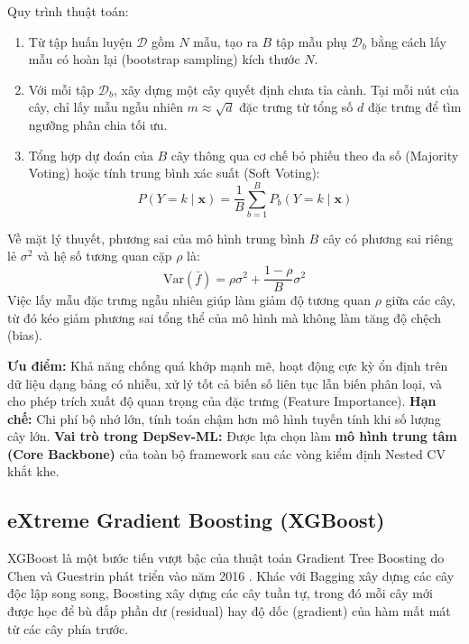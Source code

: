 Quy trình thuật toán:
\begin{enumerate}
    \item Từ tập huấn luyện $\mathcal{D}$ gồm $N$ mẫu, tạo ra $B$ tập mẫu phụ $\mathcal{D}_b$ bằng cách lấy mẫu có hoàn lại (bootstrap sampling) kích thước $N$.
    \item Với mỗi tập $\mathcal{D}_b$, xây dựng một cây quyết định chưa tỉa cành. Tại mỗi nút của cây, chỉ lấy mẫu ngẫu nhiên $m \approx \sqrt{d}$ đặc trưng từ tổng số $d$ đặc trưng để tìm ngưỡng phân chia tối ưu.
    \item Tổng hợp dự đoán của $B$ cây thông qua cơ chế bỏ phiếu theo đa số (Majority Voting) hoặc tính trung bình xác suất (Soft Voting):
    \begin{equation}
        P(Y = k \mid \mathbf{x}) = \frac{1}{B} \sum_{b=1}^B P_b(Y = k \mid \mathbf{x})
    \end{equation}
\end{enumerate}

Về mặt lý thuyết, phương sai của mô hình trung bình $B$ cây có phương sai riêng lẻ $\sigma^2$ và hệ số tương quan cặp $\rho$ là:
\begin{equation}
    \text{Var}(\bar{f}) = \rho \sigma^2 + \frac{1 - \rho}{B} \sigma^2
\end{equation}
Việc lấy mẫu đặc trưng ngẫu nhiên giúp làm giảm độ tương quan $\rho$ giữa các cây, từ đó kéo giảm phương sai tổng thể của mô hình mà không làm tăng độ chệch (bias).

\textbf{Ưu điểm:} Khả năng chống quá khớp mạnh mẽ, hoạt động cực kỳ ổn định trên dữ liệu dạng bảng có nhiễu, xử lý tốt cả biến số liên tục lẫn biến phân loại, và cho phép trích xuất độ quan trọng của đặc trưng (Feature Importance).  
\textbf{Hạn chế:} Chi phí bộ nhớ lớn, tính toán chậm hơn mô hình tuyến tính khi số lượng cây lớn.  
\textbf{Vai trò trong DepSev-ML:} Được lựa chọn làm \textbf{mô hình trung tâm (Core Backbone)} của toàn bộ framework sau các vòng kiểm định Nested CV khắt khe.

\subsection{eXtreme Gradient Boosting (XGBoost)}
XGBoost là một bước tiến vượt bậc của thuật toán Gradient Tree Boosting do Chen và Guestrin phát triển vào năm 2016 \cite{chen2016xgboost}. Khác với Bagging xây dựng các cây độc lập song song, Boosting xây dựng các cây tuần tự, trong đó mỗi cây mới được học để bù đắp phần dư (residual) hay độ dốc (gradient) của hàm mất mát từ các cây phía trước.

